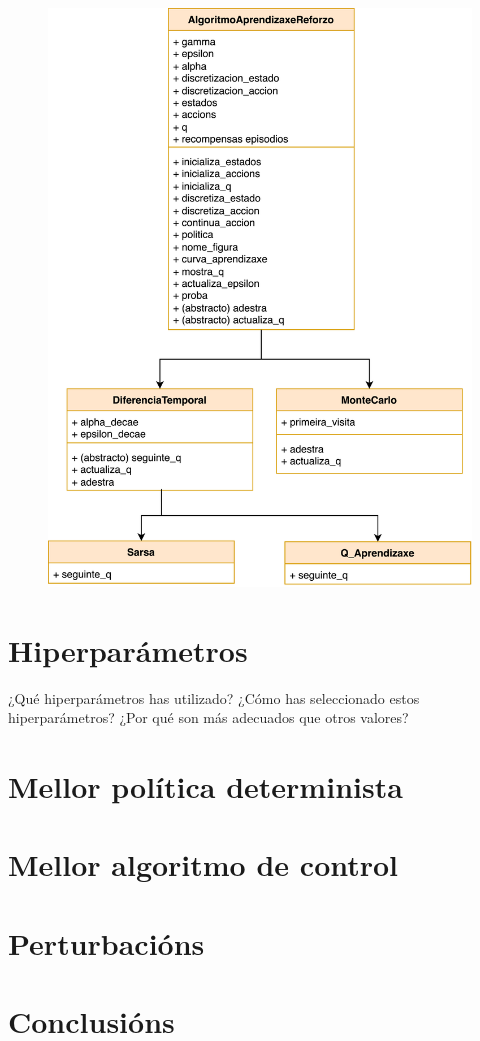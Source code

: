 \documentclass{article}
\begin{document}
\begin{figure}[h]
    \centering
    \includegraphics[width=0.7\linewidth]{herencia.drawio.png}
    
    \label{fig:enter-label}
\end{figure}

\section{Hiperparámetros}
¿Qué hiperparámetros has utilizado? ¿Cómo has seleccionado estos
hiperparámetros? ¿Por qué son más adecuados que otros valores?

\section{Mellor política determinista}
\section{Mellor algoritmo de control}
\section{Perturbacións}
\section{Conclusións}
\end{document}
